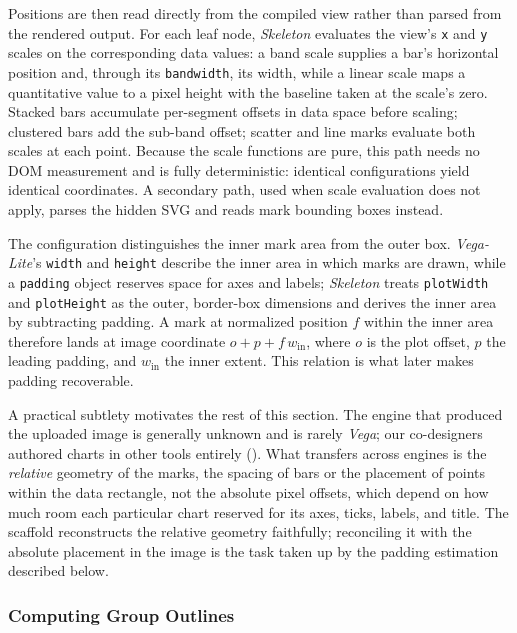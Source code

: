 \documentclass[12pt]{cmuthesis}
\begin{document}
Positions are then read directly from the compiled view rather than parsed from the rendered output. For each leaf node, \textit{Skeleton} evaluates the view's \texttt{x} and \texttt{y} scales on the corresponding data values: a band scale supplies a bar's horizontal position and, through its \texttt{bandwidth}, its width, while a linear scale maps a quantitative value to a pixel height with the baseline taken at the scale's zero. Stacked bars accumulate per-segment offsets in data space before scaling; clustered bars add the sub-band offset; scatter and line marks evaluate both scales at each point. Because the scale functions are pure, this path needs no DOM measurement and is fully deterministic: identical configurations yield identical coordinates. A secondary path, used when scale evaluation does not apply, parses the hidden SVG and reads mark bounding boxes instead.

The configuration distinguishes the inner mark area from the outer box. \textit{Vega-Lite}'s \texttt{width} and \texttt{height} describe the inner area in which marks are drawn, while a \texttt{padding} object reserves space for axes and labels; \textit{Skeleton} treats \texttt{plotWidth} and \texttt{plotHeight} as the outer, border-box dimensions and derives the inner area by subtracting padding. A mark at normalized position $f$ within the inner area therefore lands at image coordinate $o + p + f\,w_{\mathrm{in}}$, where $o$ is the plot offset, $p$ the leading padding, and $w_{\mathrm{in}}$ the inner extent. This relation is what later makes padding recoverable.

A practical subtlety motivates the rest of this section. The engine that produced the uploaded image is generally unknown and is rarely \textit{Vega}; our co-designers authored charts in other tools entirely (). What transfers across engines is the \textit{relative} geometry of the marks, the spacing of bars or the placement of points within the data rectangle, not the absolute pixel offsets, which depend on how much room each particular chart reserved for its axes, ticks, labels, and title. The scaffold reconstructs the relative geometry faithfully; reconciling it with the absolute placement in the image is the task taken up by the padding estimation described below.

\subsubsection{Computing Group Outlines}
\end{document}
